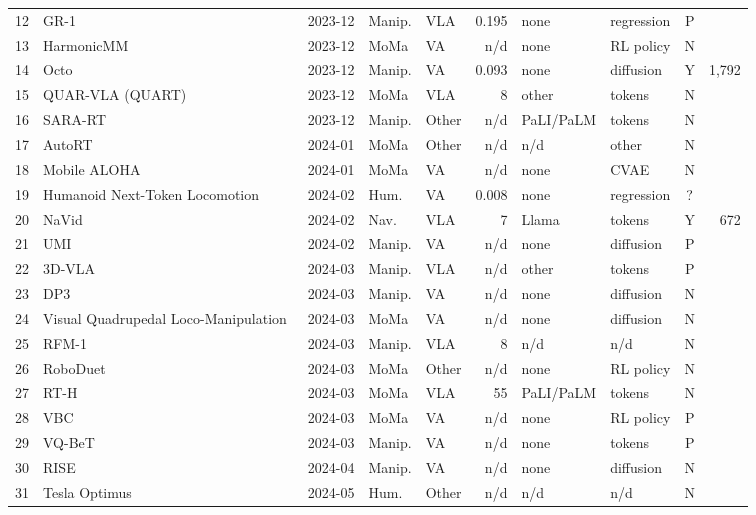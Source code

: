 \begin{longtable}{@{}r p{3.55cm} l l l r l l c r@{}}
12 & GR-1~\cite{ax231213139} & 2023-12 & Manip. & VLA & 0.195 & none & regression & P & \\
13 & HarmonicMM~\cite{ax231206639} & 2023-12 & MoMa & VA & n/d & none & RL policy & N & \\
14 & Octo~\cite{ax240512213} & 2023-12 & Manip. & VA & 0.093 & none & diffusion & Y & 1,792\\
15 & QUAR-VLA (QUART)~\cite{ax231214457} & 2023-12 & MoMa & VLA & 8 & other & tokens & N & \\
16 & SARA-RT~\cite{ax231201990} & 2023-12 & Manip. & Other & n/d & PaLI/PaLM & tokens & N & \\
17 & AutoRT~\cite{ax240112963} & 2024-01 & MoMa & Other & n/d & n/d & other & N & \\
18 & Mobile ALOHA~\cite{ax240102117} & 2024-01 & MoMa & VA & n/d & none & CVAE & N & \\
19 & Humanoid Next-Token Locomotion~\cite{ax240219469} & 2024-02 & Hum. & VA & 0.008 & none & regression & ? & \\
20 & NaVid~\cite{ax240215852} & 2024-02 & Nav. & VLA & 7 & Llama & tokens & Y & 672\\
21 & UMI~\cite{ax240210329} & 2024-02 & Manip. & VA & n/d & none & diffusion & P & \\
22 & 3D-VLA~\cite{ax240309631} & 2024-03 & Manip. & VLA & n/d & other & tokens & P & \\
23 & DP3~\cite{ax240303954} & 2024-03 & Manip. & VA & n/d & none & diffusion & N & \\
24 & Visual Quadrupedal Loco-Manipulation~\cite{ax240320328} & 2024-03 & MoMa & VA & n/d & none & diffusion & N & \\
25 & RFM-1~\cite{web-rfm-1} & 2024-03 & Manip. & VLA & 8 & n/d & n/d & N & \\
26 & RoboDuet~\cite{ax240317367} & 2024-03 & MoMa & Other & n/d & none & RL policy & N & \\
27 & RT-H~\cite{ax240301823} & 2024-03 & MoMa & VLA & 55 & PaLI/PaLM & tokens & N & \\
28 & VBC~\cite{ax240316967} & 2024-03 & MoMa & VA & n/d & none & RL policy & P & \\
29 & VQ-BeT~\cite{ax240303181} & 2024-03 & Manip. & VA & n/d & none & tokens & P & \\
30 & RISE~\cite{ax240412281} & 2024-04 & Manip. & VA & n/d & none & diffusion & N & \\
31 & Tesla Optimus~\cite{web-tesla-optimus} & 2024-05 & Hum. & Other & n/d & n/d & n/d & N & \\

\end{longtable}
